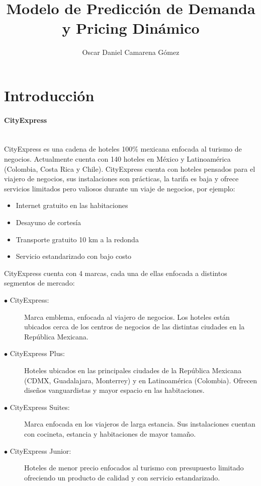 \documentclass[a4paper,11pt]{article}
\title{\Huge Modelo de Predicción de Demanda y Pricing Dinámico}
\author{Oscar Daniel Camarena Gómez}
\date{}
\begin{document}
\maketitle
{}
\newpage
{}
\section{Introducción}
\paragraph {CityExpress} ~ \\
CityExpress es una cadena de hoteles 100\% mexicana enfocada al turismo de negocios. Actualmente cuenta con 140 hoteles en México y Latinoamérica (Colombia, Costa Rica y Chile). CityExpress cuenta con hoteles pensados para el viajero de negocios, sus instalaciones son prácticas, la tarifa es baja y ofrece servicios limitados pero valiosos durante un viaje de negocios, por ejemplo:
\begin{itemize}[noitemsep]
\item Internet gratuito en las habitaciones
\item Desayuno de cortesía
\item Transporte gratuito 10 km a la redonda
\item Servicio estandarizado con bajo costo
\end{itemize}
CityExpress cuenta con 4 marcas, cada una de ellas enfocada a distintos segmentos de mercado:
\begin{description}
\item [$\bullet$ CityExpress:] Marca emblema, enfocada al viajero de negocios. Los hoteles están ubicados cerca de los centros de negocios de las distintas ciudades en la República Mexicana.
\item [$\bullet$ CityExpress Plus:] Hoteles ubicados en las principales ciudades de la República Mexicana (CDMX, Guadalajara, Monterrey) y en Latinoamérica (Colombia). Ofrecen diseños vanguardistas y mayor espacio en las habitaciones.
\item [$\bullet$ CityExpress Suites:] Marca enfocada en los viajeros de larga estancia. Sus instalaciones cuentan con cocineta, estancia y habitaciones de mayor tamaño.
\item [$\bullet$ CityExpress Junior:] Hoteles de menor precio enfocados al turismo con presupuesto limitado ofreciendo un producto de calidad y con servicio estandarizado.
\end{description}
\end{document}

